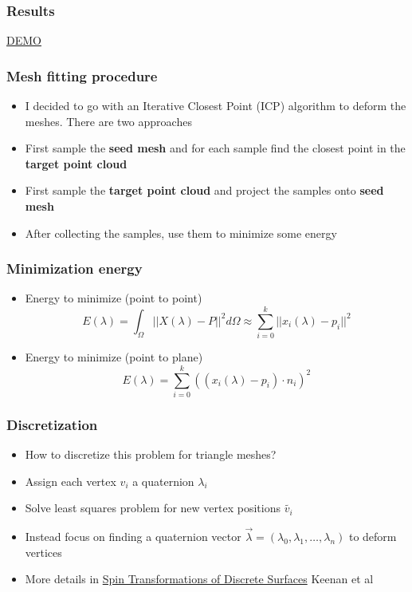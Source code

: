 \documentclass{beamer}
\begin{document}
\begin{frame}
\frametitle{Results}
\href{https://drive.google.com/open?id=0Bxe_aqElJ61ULXk0S284Y25xME0}{DEMO}
\end{frame}

\begin{frame}
\frametitle{Mesh fitting procedure}
\begin{itemize}
\item I decided to go with an Iterative Closest Point (ICP) algorithm to deform the meshes. There are two approaches
\item First sample the \textbf{seed mesh} and for each sample find the closest point in the \textbf{target point cloud}
\item First sample the \textbf{target point cloud} and project the samples onto \textbf{seed mesh}
\item After collecting the samples, use them to minimize some energy
\end{itemize}
\end{frame}

\begin{frame}
\frametitle{Minimization energy}
\begin{itemize}
\item Energy to minimize (point to point)
\begin{equation}
E(\lambda) = \int_{\Omega}||X(\lambda) - P||^{2}d\Omega \approx \sum_{i=0}^{k}||x_{i}(\lambda) - p_{i}||^{2}
\end{equation}
\item Energy to minimize (point to plane)
\begin{equation}
E(\lambda) = \sum_{i=0}^{k}((x_{i}(\lambda) - p_{i}) \cdot n_{i})^{2}
\end{equation}
\end{itemize}
\end{frame}

\begin{frame}
\frametitle{Discretization}
\begin{itemize}
\item How to discretize this problem for triangle meshes?
\item Assign each vertex $v_{i}$ a quaternion $\lambda_{i}$
\item Solve least squares problem for new vertex positions $\tilde{v_{i}}$
\item Instead focus on finding a quaternion vector $\vec{\lambda} = (\lambda_{0},\lambda_{1}, \ldots, \lambda_{n} )$ to deform vertices
\item More details in \href{https://www.cs.cmu.edu/~kmcrane/Projects/SpinTransformations/}{Spin Transformations of Discrete Surfaces} Keenan et al
\end{itemize}
\end{frame}
\end{document}
